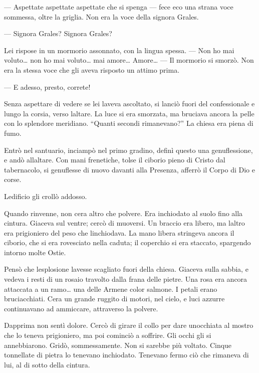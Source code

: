 --- Aspettate aspettate aspettate che si spenga --- fece eco una strana
voce sommessa, oltre la griglia. Non era la voce della signora Grales.

--- Signora Grales? Signora Grales?

Lei rispose in un mormorio assonnato, con la lingua spessa. --- Non ho
mai voluto\ldots{} non ho mai voluto\ldots{} mai amore\ldots{}
Amore\ldots{} --- Il mormorio si smorzò. Non era la stessa voce che gli
aveva risposto un attimo prima.

--- E adesso, presto, correte!

Senza aspettare di vedere se lei l\textquotesingle aveva ascoltato, si
lanciò fuori del confessionale e lungo la corsia, verso
l\textquotesingle altare. La luce si era smorzata, ma bruciava ancora la
pelle con lo splendore meridiano. ``Quanti secondi rimanevano?'' La
chiesa era piena di fumo.

Entrò nel santuario, inciampò nel primo gradino, definì questo una
genuflessione, e andò all\textquotesingle altare. Con mani frenetiche,
tolse il ciborio pieno di Cristo dal tabernacolo, si genuflesse di nuovo
davanti alla Presenza, afferrò il Corpo di Dio e corse.

L\textquotesingle edificio gli crollò addosso.

Quando rinvenne, non c\textquotesingle era altro che polvere. Era
inchiodato al suolo fino alla cintura. Giaceva sul ventre; cercò di
muoversi. Un braccio era libero, ma l\textquotesingle altro era
prigioniero del peso che l\textquotesingle inchiodava. La mano libera
stringeva ancora il ciborio, che si era rovesciato nella caduta; il
coperchio si era staccato, spargendo intorno molte Ostie.

Pensò che l\textquotesingle esplosione l\textquotesingle avesse
scagliato fuori della chiesa. Giaceva sulla sabbia, e vedeva i resti di
un rosaio travolto dalla frana delle pietre. Una rosa era ancora
attaccata a un ramo\ldots{} una delle Armene color salmone. I petali
erano bruciacchiati. C\textquotesingle era un grande ruggito di motori,
nel cielo, e luci azzurre continuavano ad ammiccare, attraverso la
polvere.

Dapprima non sentì dolore. Cercò di girare il collo per dare
un\textquotesingle occhiata al mostro che lo teneva prigioniero, ma poi
cominciò a soffrire. Gli occhi gli si annebbiarono. Gridò,
sommessamente. Non si sarebbe più voltato. Cinque tonnellate di pietra
lo tenevano inchiodato. Tenevano fermo ciò che rimaneva di lui, al di
sotto della cintura.

